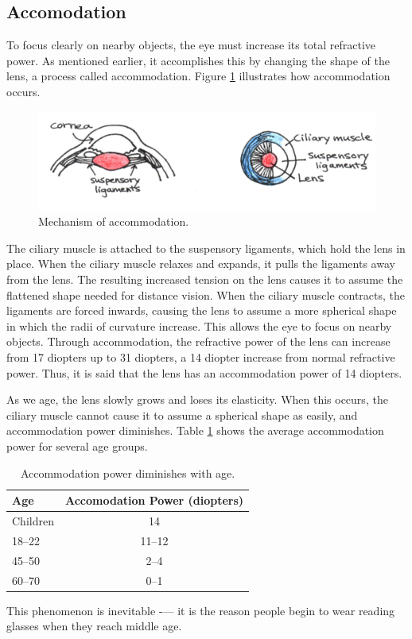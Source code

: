 \subsection{Accomodation}
To focus clearly on nearby objects, the eye must increase its total refractive power.  As mentioned earlier, it accomplishes this by changing the shape of the lens, a process called accommodation.  Figure \ref{Fig5-9} illustrates how accommodation occurs.
\begin{figure}[h]
	\centering
	\includegraphics[width=\textwidth]{./figures/Topic5/Fig5-9.png}
	\caption{Mechanism of accommodation.}
	\label{Fig5-9}
\end{figure}  
The ciliary muscle is attached to the suspensory ligaments, which hold the lens in place.  When the ciliary muscle relaxes and expands, it pulls the ligaments away from the lens. The resulting increased tension on the lens causes it to assume the flattened shape needed for distance vision.  When the ciliary muscle contracts, the ligaments are forced inwards, causing the lens to assume a more spherical shape in which the radii of curvature increase.  This allows the eye to focus on nearby objects.  Through accommodation, the refractive power of the lens can increase from 17 diopters up to 31 diopters, a 14 diopter increase from normal refractive power.  Thus, it is said that the lens has an accommodation power of 14 diopters.
 
As we age, the lens slowly grows and loses its elasticity.  When this occurs, the ciliary muscle cannot cause it to assume a spherical shape as easily, and accommodation power diminishes.  Table \ref{table5-1} shows the average accommodation power for several age groups.
\begin{table}[h]
\begin{center}
\begin{tabular}{|l|c|}
\hline
Age & Accomodation Power (diopters) \\
\hline
Children & 14 \\
18--22 & 11--12 \\
45--50 & 2--4 \\
60--70 & 0--1\\
\hline
\end{tabular}
\caption{Accommodation power diminishes with age.}
\label{table5-1}
\end{center}
\end{table}
This phenomenon is inevitable -— it is the reason people begin to wear reading glasses when they reach middle age.


